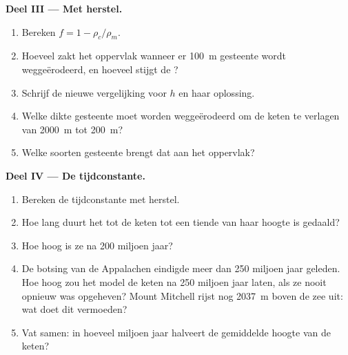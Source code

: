 \begin{problem}
\medskip
\noindent\textbf{Deel III --- Met herstel.}
\begin{enumerate}[resume]
  \item Bereken $f = 1 - \rho_c/\rho_m$.
  \item Hoeveel zakt het oppervlak wanneer er \qty{100}{m} gesteente wordt weggeërodeerd,
        en hoeveel stijgt de ?
  \item Schrijf de nieuwe vergelijking voor $h$ en haar oplossing.
  \item Welke dikte gesteente moet worden weggeërodeerd om de keten te verlagen van
        \qty{2000}{m} tot \qty{200}{m}?
  \item Welke soorten gesteente brengt dat aan het oppervlak?
\end{enumerate}

\medskip
\noindent\textbf{Deel IV --- De tijdconstante.}
\begin{enumerate}[resume]
  \item Bereken de tijdconstante met herstel.
  \item Hoe lang duurt het tot de keten tot een tiende van haar hoogte is gedaald?
  \item Hoe hoog is ze na 200 miljoen jaar?
  \item De botsing van de Appalachen eindigde meer dan 250 miljoen jaar geleden.
        Hoe hoog zou het model de keten na 250 miljoen jaar laten, als ze nooit opnieuw was opgeheven?
        Mount Mitchell rijst nog \qty{2037}{m}
        boven de zee uit: wat doet dit vermoeden?
  \item Vat samen: in hoeveel miljoen jaar halveert de gemiddelde hoogte van de
        keten?
\end{enumerate}
\end{problem}

